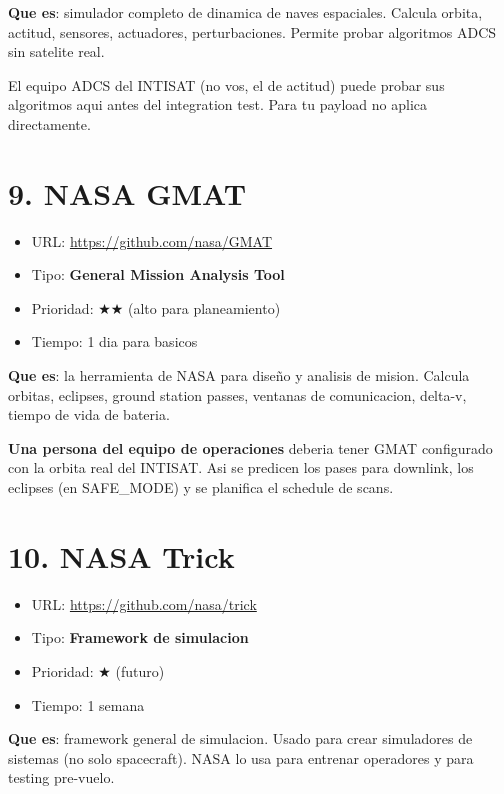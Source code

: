 \documentclass[11pt,a4paper,oneside]{report}
\begin{document}
\textbf{Que es}: simulador completo de dinamica de naves espaciales. Calcula
orbita, actitud, sensores, actuadores, perturbaciones. Permite probar
algoritmos ADCS sin satelite real.

\begin{nota}
El equipo ADCS del INTISAT (no vos, el de actitud) puede probar sus
algoritmos aqui antes del integration test. Para tu payload no aplica
directamente.
\end{nota}

\section{9. NASA GMAT}

\begin{itemize}[leftmargin=1.5em]
  \item URL: \url{https://github.com/nasa/GMAT}
  \item Tipo: \textbf{General Mission Analysis Tool}
  \item Prioridad: $\bigstar\bigstar$ (alto para planeamiento)
  \item Tiempo: 1 dia para basicos
\end{itemize}

\textbf{Que es}: la herramienta de NASA para diseño y analisis de mision.
Calcula orbitas, eclipses, ground station passes, ventanas de comunicacion,
delta-v, tiempo de vida de bateria.

\begin{nota}
\textbf{Una persona del equipo de operaciones} deberia tener GMAT
configurado con la orbita real del INTISAT. Asi se predicen los pases
para downlink, los eclipses (en SAFE\_MODE) y se planifica el schedule
de scans.
\end{nota}

\section{10. NASA Trick}

\begin{itemize}[leftmargin=1.5em]
  \item URL: \url{https://github.com/nasa/trick}
  \item Tipo: \textbf{Framework de simulacion}
  \item Prioridad: $\bigstar$ (futuro)
  \item Tiempo: 1 semana
\end{itemize}

\textbf{Que es}: framework general de simulacion. Usado para crear
simuladores de sistemas (no solo spacecraft). NASA lo usa para entrenar
operadores y para testing pre-vuelo.
\end{document}
